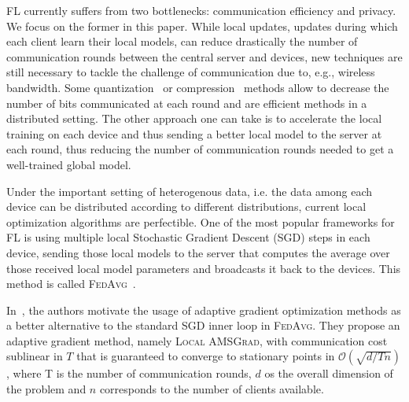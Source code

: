 \documentclass{article}
\begin{document}
FL currently suffers from two bottlenecks: communication efficiency and privacy.
We focus on the former in this paper.
While local updates, updates during which each client learn their local models, can reduce drastically the number of communication rounds between the central server and devices, new techniques are still necessary to tackle the  challenge of communication due to, e.g., wireless bandwidth.
Some quantization~\citep{alistarh2017qsgd, wangni2018gradient} or compression~\citep{lin2017deep} methods allow to decrease the number of bits communicated at each round and are efficient methods in a distributed setting.
The other approach one can take is to accelerate the local training on each device and thus sending a better local model to the server at each round, thus reducing the number of communication rounds needed to get a well-trained global model.

Under the important setting of heterogenous data, i.e. the data among each device can be distributed according to different distributions, current local optimization algorithms are perfectible.
One of the most popular frameworks for FL is using multiple local Stochastic Gradient Descent (\textsc{SGD}) steps in each device, sending those local models to the server that computes the average over those received local model parameters and broadcasts it back to the devices. This method is called \textsc{FedAvg}~\citep{mcmahan2017communication}.

In~\citet{chen2020toward}, the authors motivate the usage of adaptive gradient optimization methods as a better alternative to the standard \textsc{SGD} inner loop in \textsc{FedAvg}.
They propose an adaptive gradient method, namely \textsc{Local AMSGrad}, with communication cost sublinear in $T$ that is guaranteed to converge to stationary points in $\mathcal{O}(\sqrt{d/Tn})$, where T is the number of communication rounds, $d$ os the overall dimension of the problem and $n$ corresponds to the number of clients available.
\end{document}
